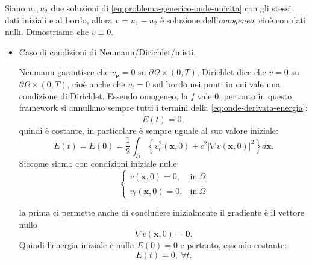 \documentclass[10pt,a4paper,twoside,openright]{book}
\begin{document}
\begin{dimostrazione}
	Siano $u_{1} ,u_{2}$ due soluzioni di \eqref{eq:problema-generico-onde-unicita} con gli stessi dati iniziali e al bordo, allora $v=u_{1} -u_{2}$ è soluzione dell'\textit{omogeneo}, cioè con dati nulli. Dimostriamo che $v\equiv 0$.
	\begin{itemize}
		\item Caso di condizioni di Neumann/Dirichlet/misti.
		      
		      Neumann garantisce che $v_{\bm{\nu }} =0$ su $\partial \Omega \times ( 0,T)$, Dirichlet dice che $v=0$ su $\partial \Omega \times ( 0,T)$, cioè anche che $v_{t} =0$ sul bordo nei punti in cui vale una condizione di Dirichlet. Essendo omogeneo, la $f$ vale $0$, pertanto in questo framework si annullano sempre tutti i termini della \eqref{eq:onde-derivata-energia}:
		      \begin{equation*}
		      	\dot{E}( t) =0,
		      \end{equation*}quindi è costante, in particolare è sempre uguale al suo valore iniziale:
		      \begin{equation*}
		      	E( t) =E( 0) =\frac{1}{2}\int _{\Omega }\left\{v_{t}^{2}(\mathbf{x} ,0) +c^{2}| \nabla v(\mathbf{x} ,0)| ^{2}\right\} d\mathbf{x} .
		      \end{equation*}Siccome siamo con condizioni iniziale nulle:
		      \begin{equation*}
		      	\begin{cases}
		      		v(\mathbf{x} ,0) =0,     & \text{in} \ \overline{\Omega } \\
		      		v_{t}(\mathbf{x} ,0) =0, & \text{in} \ \overline{\Omega } 
		      	\end{cases}
		      \end{equation*}
		      
		      la prima ci permette anche di concludere inizialmente il gradiente è il vettore nullo\begin{equation*}
		      \nabla v(\mathbf{x} ,0) =\mathbf{0} .
		\end{equation*}Quindi l'energia iniziale è nulla $E( 0) =0$ e pertanto, essendo costante:
		\begin{equation*}
			E( t) =0,\ \forall t.
		\end{equation*}
		

\end{itemize}
\end{dimostrazione}
\end{document}
